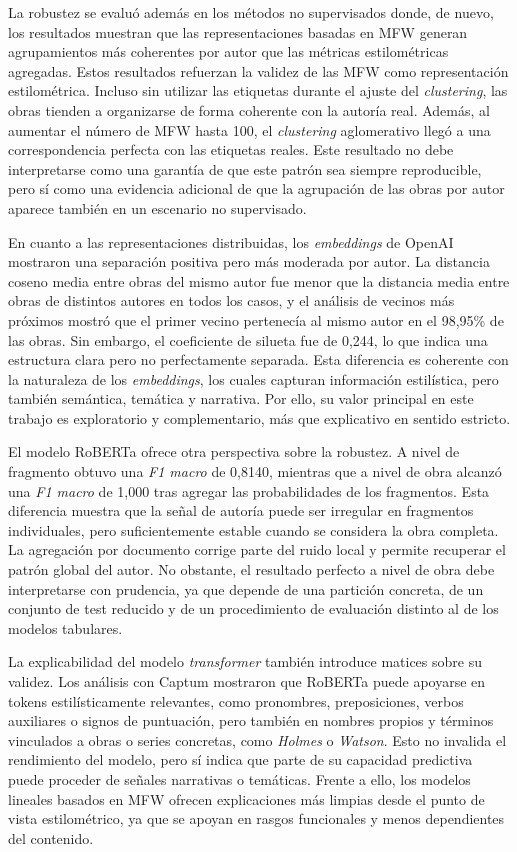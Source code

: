 \documentclass[IB]{TFUOC}%
\begin{document}
La robustez se evaluó además en los métodos no supervisados donde, de nuevo, los resultados muestran que las representaciones basadas en MFW generan agrupamientos más coherentes por autor que las métricas estilométricas agregadas. Estos resultados refuerzan la validez de las MFW como representación estilométrica. Incluso sin utilizar las etiquetas durante el ajuste del \textit{clustering}, las obras tienden a organizarse de forma coherente con la autoría real. Además, al aumentar el número de MFW hasta 100, el \textit{clustering} aglomerativo llegó a una correspondencia perfecta con las etiquetas reales. Este resultado no debe interpretarse como una garantía de que este patrón sea siempre reproducible, pero sí como una evidencia adicional de que la agrupación de las obras por autor aparece también en un escenario no supervisado.

En cuanto a las representaciones distribuidas, los \textit{embeddings} de OpenAI mostraron una separación positiva pero más moderada por autor. La distancia coseno media entre obras del mismo autor fue menor que la distancia media entre obras de distintos autores en todos los casos, y el análisis de vecinos más próximos mostró que el primer vecino pertenecía al mismo autor en el 98,95\% de las obras. Sin embargo, el coeficiente de silueta fue de 0,244, lo que indica una estructura clara pero no perfectamente separada. Esta diferencia es coherente con la naturaleza de los \textit{embeddings}, los cuales capturan información estilística, pero también semántica, temática y narrativa. Por ello, su valor principal en este trabajo es exploratorio y complementario, más que explicativo en sentido estricto.

El modelo RoBERTa ofrece otra perspectiva sobre la robustez. A nivel de fragmento obtuvo una \textit{F1 macro} de 0,8140, mientras que a nivel de obra alcanzó una \textit{F1 macro} de 1,000 tras agregar las probabilidades de los fragmentos. Esta diferencia muestra que la señal de autoría puede ser irregular en fragmentos individuales, pero suficientemente estable cuando se considera la obra completa. La agregación por documento corrige parte del ruido local y permite recuperar el patrón global del autor. No obstante, el resultado perfecto a nivel de obra debe interpretarse con prudencia, ya que depende de una partición concreta, de un conjunto de test reducido y de un procedimiento de evaluación distinto al de los modelos tabulares.

La explicabilidad del modelo \textit{transformer} también introduce matices sobre su validez. Los análisis con Captum mostraron que RoBERTa puede apoyarse en tokens estilísticamente relevantes, como pronombres, preposiciones, verbos auxiliares o signos de puntuación, pero también en nombres propios y términos vinculados a obras o series concretas, como \textit{Holmes} o \textit{Watson}. Esto no invalida el rendimiento del modelo, pero sí indica que parte de su capacidad predictiva puede proceder de señales narrativas o temáticas. Frente a ello, los modelos lineales basados en MFW ofrecen explicaciones más limpias desde el punto de vista estilométrico, ya que se apoyan en rasgos funcionales y menos dependientes del contenido.
\end{document}
